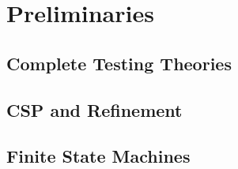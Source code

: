 \section{Preliminaries}
\subsection{Complete Testing Theories}


\subsection{CSP and Refinement}



\subsection{Finite State Machines}